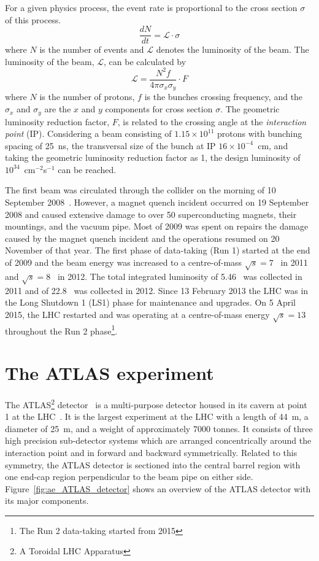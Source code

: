 For a given physics process, the event rate is proportional to the cross section $\sigma$ of this process.
%
\begin{equation}
\frac{dN}{dt} = \mathcal{L}\cdot\sigma
\end{equation}
%
where $N$ is the number of events and $\mathcal{L}$ denotes the luminosity of the beam.
The luminosity of the beam, $\mathcal{L}$, can be calculated by
%
\begin{equation}
\mathcal{L} = \frac{N^{2} f}{4 \pi \sigma_{x} \sigma_{y}} \cdot F
\end{equation}
%
where $N$ is the number of protons, $f$ is the bunches crossing frequency, and the $\sigma_{x}$ and $\sigma_{y}$ are the $x$ and $y$ components for cross section $\sigma$.
The geometric luminosity reduction factor, $F$, is related to the crossing angle at the \textit{interaction point} (IP).
Considering a beam consisting of $1.15 \times 10^{11}$ protons with bunching spacing of 25~ns, the transversal size of the bunch at IP $16\times 10^{-4}$~cm, and taking the geometric luminosity reduction factor as 1, the design luminosity of $10^{34}$~cm$^{-2}$s$^{-1}$ can be reached.

The first beam was circulated through the collider on the morning of 10 September 2008~\cite{CERN-COURIER-Sep192008}.
However, a magnet quench incident occurred on 19 September 2008 and caused extensive damage to over 50 superconducting magnets, their mountings, and the vacuum pipe.
Most of 2009 was spent on repairs the damage caused by the magnet quench incident and the operations resumed on 20 November of that year.
The first phase of data-taking (Run 1) started at the end of 2009 and the beam energy was increased to a centre-of-mass $\sqrt{s}=7$~{\TeV} in 2011 and $\sqrt{s} = 8$~{\TeV} in 2012.
The total integrated luminosity of 5.46~{\ifb} was collected in 2011 and of 22.8~{\ifb} was collected in 2012.
Since 13 February 2013 the LHC was in the Long Shutdown 1 (LS1) phase for maintenance and upgrades.
On 5 April 2015, the LHC restarted and was operating at a centre-of-mass energy $\sqrt{s}=13$~{\TeV} throughout the Run 2 phase\footnote{The Run 2 data-taking started from 2015}.


\section{The ATLAS experiment}
\label{sec:ae_ATLAS}
The ATLAS\footnote{A Toroidal LHC Apparatus} detector~\cite{1748-0221-3-08-S08003} is a multi-purpose detector housed in its cavern at point 1 at the LHC~\cite{1748-0221-3-08-S08001}.
It is the largest experiment at the LHC with a length of 44~m, a diameter of 25~m, and a weight of approximately 7000 tonnes.
It consists of three high precision sub-detector systems which are arranged concentrically around the interaction point and in forward and backward symmetrically.
Related to this symmetry, the ATLAS detector is sectioned into the central barrel region with one end-cap region perpendicular to the beam pipe on either side.
Figure~\ref{fig:ae_ATLAS_detector} shows an overview of the ATLAS detector with its major components.

